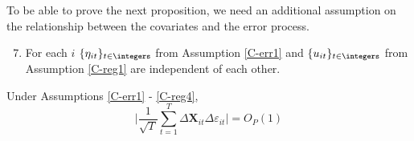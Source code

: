 To be able to prove the next proposition, we need an additional assumption on the relationship between the covariates and the error process.

\begin{enumerate}[label=(C\arabic*),leftmargin=1.05cm]
\setcounter{enumi}{6}
\item \label{C-reg4} For each $i$ $\{\eta_{it}\}_{t\in\integers}$ from Assumption \ref{C-err1} and $\{u_{it}\}_{t\in\integers}$ from Assumption \ref{C-reg1} are independent of each other.
\end{enumerate}


\begin{prop}\label{prop-reg-2}
Under Assumptions \ref{C-err1} - \ref{C-reg4},
\[ \Big| \frac{1}{\sqrt{T}}\sum_{t=1}^T \Delta \mathbf{X}_{it}\Delta \varepsilon_{it} \Big| = O_P(1)
\]
\end{prop}
